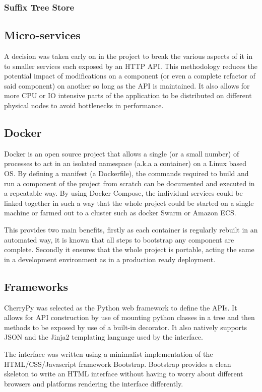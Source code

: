 \documentclass[11pt, a4paper]{scrartcl}
\begin{document}
	\subsubsection{Suffix Tree Store}
	
	\subsection{Micro-services}
	A decision was taken early on in the project to break the various aspects of it in to smaller services each exposed by an HTTP API.  This methodology reduces the potential impact of modifications on a component (or even a complete refactor of said component) on another so long as the API is maintained.  It also allows for more CPU or IO intensive parts of the application to be distributed on different physical nodes to avoid bottlenecks in performance.
	
	\subsection{Docker}
	Docker is an open source project that allows a single (or a small number) of processes to act in an isolated namespace (a.k.a a container) on a Linux based OS.  By defining a manifest (a Dockerfile), the commands required to build and run a component of the project from scratch can be documented and executed in a repeatable way.  By using Docker Compose, the individual services could be linked together in such a way that the whole project could be started on a single machine or farmed out to a cluster such as docker Swarm or Amazon ECS.
	
	This provides two main benefits, firstly as each container is regularly rebuilt in an automated way, it is known that all steps to bootstrap any component are complete.  Secondly it ensures that the whole project is portable, acting the same in a development environment as in a production ready deployment.
	
	\subsection{Frameworks}
	CherryPy was selected as the Python web framework to define the APIs.  It allows for API construction by use of mounting python classes in a tree and then methods to be exposed by use of a built-in decorator.  It also natively supports JSON and the Jinja2 templating language used by the interface.
	
	The interface was written using a minimalist implementation of the HTML/CSS/Javascript framework Bootstrap.  Bootstrap provides a clean skeleton to write an HTML interface without having to worry about different browsers and platforms rendering the interface differently.
	
\end{document}
